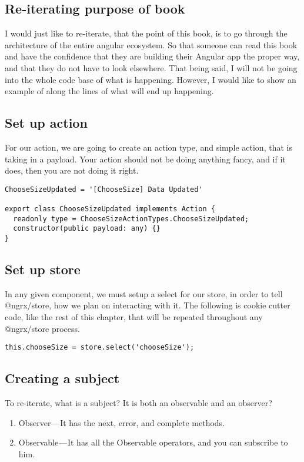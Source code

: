 \subsection{ Re-iterating purpose of book }

I would just like to re-iterate, that the point of this book, is to go through
the architecture of the entire angular ecosystem. So that someone can read this
book and have the confidence that they are building their Angular app the proper
way, and that they do not have to look elsewhere. That being said, I will not be
going into the whole code base of what is happening. However, I would like to show
an example of along the lines of what will end up happening.

\subsection{ Set up action }
For our action, we are going to create an action type, and simple action, that
is taking in a payload. Your action should not be doing anything fancy, and if
it does, then you are not doing it right.

\begin{lstlisting}
ChooseSizeUpdated = '[ChooseSize] Data Updated'

export class ChooseSizeUpdated implements Action {
  readonly type = ChooseSizeActionTypes.ChooseSizeUpdated;
  constructor(public payload: any) {}
}
\end{lstlisting}

\subsection{ Set up store }
In any given component, we must setup a select for our store, in order to tell
@ngrx/store, how we plan on interacting with it. The following is cookie cutter
code, like the rest of this chapter, that will be repeated throughout any
@ngrx/store process.

\begin{lstlisting}
this.chooseSize = store.select('chooseSize');
\end{lstlisting}

\subsection{ Creating a subject }

To re-iterate, what is a subject? It is both an observable and an observer?
\begin{enumerate}
  \item Observer — It has the next, error, and complete methods.
  \item Observable — It has all the Observable operators, and you can subscribe
  to him.
\end{enumerate}


